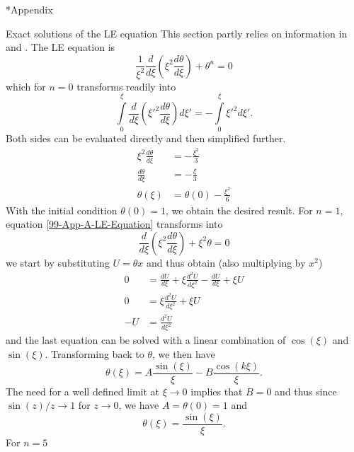 \begin{appendix}
\renewcommand{\thesection}{\Alph{section}}
\renewcommand{\thesubsection}{\Alph{subsection}}

\begin{section}*{Appendix}
%
%
\begin{subsection}{Exact solutions of the LE equation}
\label{99-App-A-Exact-LE-Solutions}
This section partly relies on information in \cite{weissteinLaneEmdenDifferentialEquation} and \cite{chandrasekharChandrasekharAnIntroductionStudy1958}. The LE equation is
\begin{equation}
	\frac{1}{\xi^2}\frac{d}{d\xi}\left(\xi^2\frac{d\theta}{d\xi}\right)+\theta^n=0
	\label{99-App-A-LE-Equation}
\end{equation}
which for $n=0$ transforms readily into
\begin{equation}
	\int\limits_0^\xi\frac{d}{d\xi}\left(\xi'^2\frac{d\theta}{d\xi}\right)d\xi' = -\int\limits_0^\xi\xi'^2d\xi'.
\end{equation}
Both sides can be evaluated directly and then simplified further.
\begin{align}
	\xi^2\frac{d\theta}{d\xi} &= -\frac{\xi^3}{3}\\
	\frac{d\theta}{d\xi} &= -\frac{\xi}{3}\\
	\theta(\xi) &= \theta(0)-\frac{\xi^2}{6}
\end{align}
With the initial condition $\theta(0)=1$, we obtain the desired result. For $n=1$, equation \ref{99-App-A-LE-Equation} transforms into
\begin{equation}
	\frac{d}{d\xi}\left(\xi^2\frac{d\theta}{d\xi}\right)+\xi^2\theta=0
\end{equation}
we start by substituting $U=\theta x$ and thus obtain (also multiplying by $x^2$)
\begin{align}
	0 &= \frac{dU}{d\xi} + \xi\frac{d^2U}{d\xi^2} - \frac{dU}{d\xi} + \xi U\\
	0 &= \xi\frac{d^2U}{d\xi^2} + \xi U\\
	-U &= \frac{d^2U}{d\xi^2}
\end{align}
and the last equation can be solved with a linear combination of $\cos(\xi)$ and $\sin(\xi)$. Transforming back to $\theta$, we then have
\begin{equation}
	\theta(\xi) = A\frac{\sin(\xi)}{\xi} - B\frac{\cos(k\xi)}{\xi}.
\end{equation}
The need for a well defined limit at $\xi\rightarrow0$ implies that $B=0$ and thus since $\sin(z)/z\rightarrow1$ for $z\rightarrow0$, we have $A=\theta(0)=1$ and 
\begin{equation}
	\theta(\xi) = \frac{\sin(\xi)}{\xi}.
\end{equation}
For $n=5$





\end{subsection}
%
%
\end{section}
\end{appendix}
